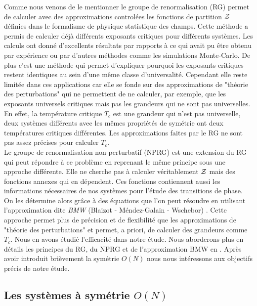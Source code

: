 \documentclass[10.5pt]{article}
\begin{document}
\begin{multicols*}{2}
Comme nous venons de le mentionner le groupe de renormalisation (RG) permet de calculer avec des approximations controlées les fonctions de partition $\mathcal{Z}$ définies dans le formalisme de physique statistique des champs. Cette méthode a permis de calculer déjà différents exposants critiques pour différents systèmes. Les calculs ont donné  d'excellents résultats \cite{kadanoff1967scaling, wilson1971renormalization2} par rapports à ce qui avait pu être obtenu par expérience ou par  d'autres méthodes comme les simulations Monte-Carlo. De plus c'est une méthode qui permet d'expliquer pourquoi les exposants critiques restent identiques au sein d'une même classe d'universalité. Cependant elle reste limitée dans ces applications car elle se fonde sur des approximations de "théorie des perturbations" qui ne permettent de ne calculer, par exemple, que les exposants universels critiques mais pas les grandeurs qui ne sont pas universelles. En effet, la température critique $T_c$ est une grandeur qui n'est pas universelle, deux systèmes différents avec les mêmes propriétés de symétrie ont deux températures critiques différentes. Les approximations faites par le RG ne sont pas assez précises pour calculer $T_c$.\\

Le groupe de renormalisation non perturbatif (NPRG) est une extension du RG qui peut répondre à ce problème en reprenant le même principe sous une approche différente. Elle ne cherche pas à calculer véritablement $\mathcal{Z}$ mais des fonctions annexes qui en dépendent. Ces fonctions contiennent aussi les informations nécessaires de nos systèmes pour l'étude des transitions de phase. On les détermine alors grâce à des équations que l'on peut résoudre en utilisant l'approximation dite \textit{BMW} (Blaizot - Méndez-Galain - Wschebor) \cite{Blaizot}. Cette approche permet  plus de précision et de flexibilité que les approximations de "théorie des perturbations" et permet, a priori, de calculer des grandeurs comme $T_c$. Nous en avons étudié l'efficacité dans notre étude. Nous aborderons plus en détails les principes du RG, du NPRG et de l'approximation BMW en . Après avoir introduit brièvement la symétrie $O(N)$ nous nous intéressons aux objectifs précis de notre étude.


\subsection{Les systèmes à symétrie $O(N)$}

\label{sec:ON}


\end{multicols*}
\end{document}
